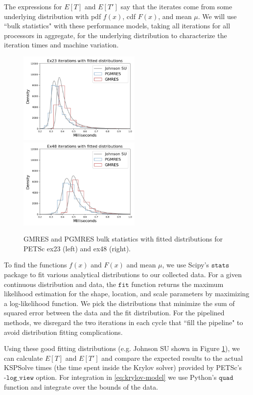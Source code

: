 \documentclass[num-refs]{wiley-article}
\begin{document}
The expressions for $E[T]$ and $E[T']$ say that the iterates come from some underlying  distribution with pdf $f(x)$, cdf $F(x)$, and mean $\mu$. 
We will use ``bulk statistics" with these performance models, taking all iterations for all processors in aggregate, for the underlying distribution to characterize the iteration times and machine variation. 

\begin{figure}[b]
\centering
\includegraphics[width=6cm]{../plots/GMRES_PGMRES_ex23_8192_1000000_bulk_stats_with_johnsonsu.png}
\includegraphics[width=6cm]{../plots/GMRES_PGMRES_ex48_8192_1000000_bulk_stats_with_johnsonsu.png} 
\caption{GMRES and PGMRES bulk statistics with fitted distributions for PETSc ex23 (left) and ex48 (right).} \label{fig:bulk-fitted}
\end{figure}

To find the functions $f(x)$ and $F(x)$ and mean $\mu$, we use Scipy's ${\texttt{stats}}$ package to fit various analytical distributions to our collected data. For a given continuous distribution and data, the ${\texttt{fit}}$ function returns the maximum likelihood estimation for the shape, location, and scale parameters by maximizing a log-likelihood function.  
We pick the distributions that minimize the sum of squared error between the data and the fit distribution.
For the pipelined methods, we disregard the two iterations in each cycle that ``fill the pipeline" to avoid distribution fitting complications.




Using these good fitting distributions (e.g. Johnson SU shown in Figure \ref{fig:bulk-fitted}), we can calculate $E[T]$ and $E[T']$ and compare the expected results to the actual KSPSolve times (the time spent inside the Krylov solver) provided by PETSc's ${\texttt{-log\_view}}$ option. 
For integration in \eqref{eq:krylov-model} we use Python's ${\texttt{quad}}$ function and integrate over the bounds of the data.
\end{document}
